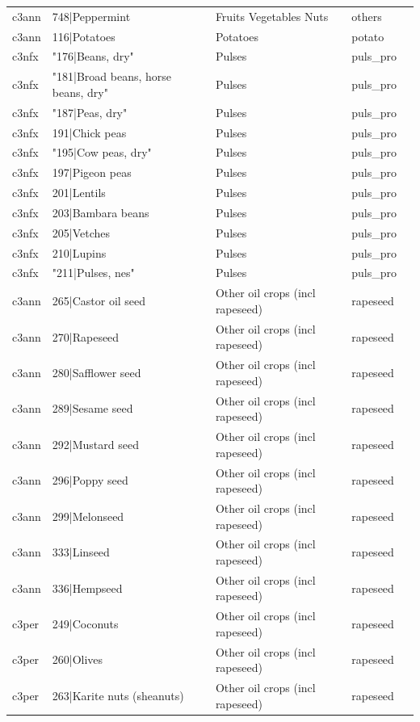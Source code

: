 \documentclass[gc, manuscript]{copernicus}
\begin{document}
\begin{table}[htbp]
\begin{tabular}{lllll}
      c3ann & 748|Peppermint & Fruits Vegetables Nuts & others \\ 
      c3ann & 116|Potatoes & Potatoes & potato \\ 
      c3nfx & "176|Beans, dry" & Pulses & puls\_pro \\ 
      c3nfx & "181|Broad beans, horse beans, dry" & Pulses & puls\_pro \\ 
      c3nfx & "187|Peas, dry" & Pulses & puls\_pro \\ 
      c3nfx & 191|Chick peas & Pulses & puls\_pro \\ 
      c3nfx & "195|Cow peas, dry" & Pulses & puls\_pro \\ 
      c3nfx & 197|Pigeon peas & Pulses & puls\_pro \\ 
      c3nfx & 201|Lentils & Pulses & puls\_pro \\ 
      c3nfx & 203|Bambara beans & Pulses & puls\_pro \\ 
      c3nfx & 205|Vetches & Pulses & puls\_pro \\ 
      c3nfx & 210|Lupins & Pulses & puls\_pro \\ 
      c3nfx & "211|Pulses, nes" & Pulses & puls\_pro \\ 
      c3ann & 265|Castor oil seed & Other oil crops (incl rapeseed) & rapeseed \\ 
      c3ann & 270|Rapeseed & Other oil crops (incl rapeseed) & rapeseed \\ 
      c3ann & 280|Safflower seed & Other oil crops (incl rapeseed) & rapeseed \\ 
      c3ann & 289|Sesame seed & Other oil crops (incl rapeseed) & rapeseed \\ 
      c3ann & 292|Mustard seed & Other oil crops (incl rapeseed) & rapeseed \\ 
      c3ann & 296|Poppy seed & Other oil crops (incl rapeseed) & rapeseed \\ 
      c3ann & 299|Melonseed & Other oil crops (incl rapeseed) & rapeseed \\ 
      c3ann & 333|Linseed & Other oil crops (incl rapeseed) & rapeseed \\ 
      c3ann & 336|Hempseed & Other oil crops (incl rapeseed) & rapeseed \\ 
      c3per & 249|Coconuts & Other oil crops (incl rapeseed) & rapeseed \\ 
      c3per & 260|Olives & Other oil crops (incl rapeseed) & rapeseed \\ 
      c3per & 263|Karite nuts (sheanuts) & Other oil crops (incl rapeseed) & rapeseed \\ 

\end{tabular}
\end{table}
\end{document}
